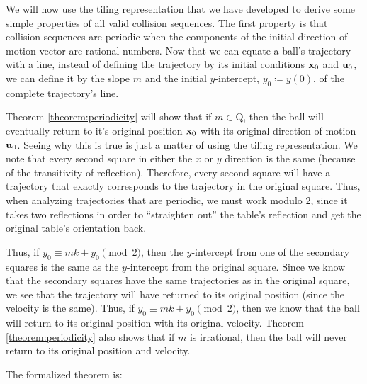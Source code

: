 
We will now use the tiling representation that we have developed to derive some simple properties of all valid collision sequences. The first property is that collision sequences are periodic when the components of the initial direction of motion vector are rational numbers. Now that we can equate a ball's trajectory with a line, instead of defining the trajectory by its initial conditions $\mathbf{x}_0$ and $\mathbf{u}_0$, we can define it by the slope $m$ and the initial $y$-intercept, $y_0 \coloneqq y(0)$, of the complete trajectory's line.

Theorem \ref{theorem:periodicity} will show that if $m \in \mathrm{Q}$, then the ball will eventually return to it's original position $\mathbf{x}_0$ with its original direction of motion $\mathbf{u}_0$. Seeing why this is true is just a matter of using the tiling representation. We note that every second square in either the $x$ or $y$ direction is the same (because of the transitivity of reflection). Therefore, every second square will have a trajectory that exactly corresponds to the trajectory in the original square. Thus, when analyzing trajectories that are periodic, we must work modulo 2, since it takes two reflections in order to ``straighten out'' the table's reflection and get the original table's orientation back.

Thus, if $y_0 \equiv mk + y_0 \pmod{2}$, then the $y$-intercept from one of the secondary squares is the same as the $y$-intercept from the original square. Since we know that the secondary squares have the same trajectories as in the original square, we see that the trajectory will have returned to its original position (since the velocity is the same). Thus, if $y_0 \equiv mk + y_0 \pmod{2}$, then we know that the ball will return to its original position with its original velocity. Theorem \ref{theorem:periodicity} also shows that if $m$ is irrational, then the ball will never return to its original position and velocity.

The formalized theorem is:

